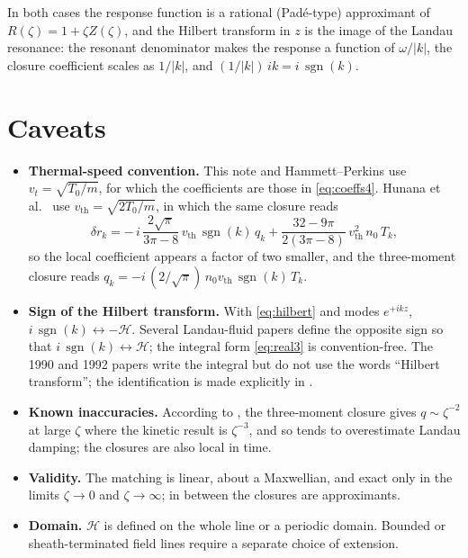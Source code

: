 \documentclass[11pt]{article}
\newcommand{\sgn}{\operatorname{sgn}}
\newcommand{\Hil}{\mathcal{H}}
\newcommand{\vt}{v_t}
\begin{document}
In both cases the response function is a rational (Pad\'e-type) approximant
of $R(\zeta) = 1 + \zeta Z(\zeta)$, and the Hilbert transform in $z$ is the
image of the Landau resonance: the resonant denominator makes the response a
function of $\omega/|k|$, the closure coefficient scales as $1/|k|$, and
$(1/|k|)\,ik = i\,\sgn(k)$.

\section{Caveats}
\label{sec:caveat}

\begin{itemize}
  \item \textbf{Thermal-speed convention.} This note and
    Hammett--Perkins use $\vt = \sqrt{T_0/m}$, for which the coefficients are
    those in \eqref{eq:coeffs4}. Hunana et al.\ \cite{Hunana19} use
    $v_{\mathrm{th}} = \sqrt{2T_0/m}$, in which the same closure reads
    \[
      \delta r_k = -\,i\,\frac{2\sqrt{\pi}}{3\pi - 8}\,v_{\mathrm{th}}\,
                   \sgn(k)\,q_k
                 + \frac{32 - 9\pi}{2(3\pi - 8)}\,v_{\mathrm{th}}^2\,n_0\,T_k ,
    \]
    so the local coefficient appears a factor of two smaller, and the
    three-moment closure reads
    $q_k = -i\,(2/\sqrt{\pi})\,n_0 v_{\mathrm{th}}\,\sgn(k)\,T_k$.
  \item \textbf{Sign of the Hilbert transform.} With \eqref{eq:hilbert} and
    modes $e^{+ikz}$, $i\,\sgn(k) \leftrightarrow -\Hil$. Several
    Landau-fluid papers define the opposite sign so that
    $i\,\sgn(k) \leftrightarrow \Hil$; the integral form \eqref{eq:real3}
    is convention-free. The 1990 and 1992 papers write the integral but do
    not use the words ``Hilbert transform''; the identification is made
    explicitly in \cite{Hunana19}.
  \item \textbf{Known inaccuracies.} According to \cite{Hunana19}, the
    three-moment closure gives $q \sim \zeta^{-2}$ at large $\zeta$ where
    the kinetic result is $\zeta^{-3}$, and so tends to overestimate Landau
    damping; the closures are also local in time.
  \item \textbf{Validity.} The matching is linear, about a Maxwellian, and
    exact only in the limits $\zeta \to 0$ and $\zeta \to \infty$; in between
    the closures are approximants.
  \item \textbf{Domain.} $\Hil$ is defined on the whole line or a periodic
    domain. Bounded or sheath-terminated field lines require a separate
    choice of extension.
\end{itemize}
\end{document}
